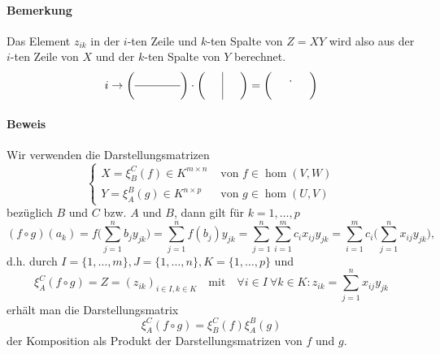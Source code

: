 \paragraph{Bemerkung}
	Das Element $ z_{ik} $ in der $ i $-ten Zeile und $ k $-ten Spalte von $ Z = XY $ wird also aus der $ i $-ten Zeile von $ X $ und der $k$-ten Spalte von $ Y $ berechnet.
	\begin{align*}
	    i\rightarrow
            \left(\begin{array}{cccc}
                &&&\\ 
                \hline
                &&&\\
            \end{array}\right)
            \cdot
            \left(\begin{array}{ccc}
                &\vline &\\
                &\vline &\\
            \end{array}\right)
            =
             \left(\begin{array}{ccc}
                & .&\\
                & &\\
            \end{array}\right)
	\end{align*}
\paragraph{Beweis}
	Wir verwenden die Darstellungsmatrizen
		\[ \begin{cases}
		X = \xi^C_B(f)\in K^{m\times n} &\text{ von } f\in \hom(V,W)\\
		Y = \xi_A^B(g)\in K^{n\times p} &\text{ von } g\in \hom(U,V)
		\end{cases} \]
	bezüglich $ B $ und $ C $ bzw. $ A $ und $ B $, dann gilt für $ k=1,\dots,p $
		\[ (f\circ g)(a_k)=f\Big(\sum_{j=1}^{n}b_jy_{jk}\Big) = \sum_{j=1}^{n}f(b_j)y_{jk} = \sum_{j=1}^{n}\sum_{i=1}^{m}c_ix_{ij}y_{jk} = \sum_{i=1}^{m}c_i\Big(\sum_{j=1}^{n}x_{ij}y_{jk}\Big), \]
	d.h. durch $ I=\{1,\dots,m\},J=\{1,\dots,n\},K=\{1,\dots,p\} $ und 
		\[ \xi_A^C(f\circ g) = Z = (z_{ik})_{i\in I,k\in K} \quad\text{mit}\quad \forall i\in I\ \forall k\in K: z_{ik}= \sum_{j=1}^{n}x_{ij}y_{jk} \]
	erhält man die Darstellungsmatrix
		\[ \xi_A^C(f\circ g) = \xi_B^C(f)\xi_A^B(g) \]
	der Komposition als Produkt der Darstellungsmatrizen von $ f $ und $ g $.
